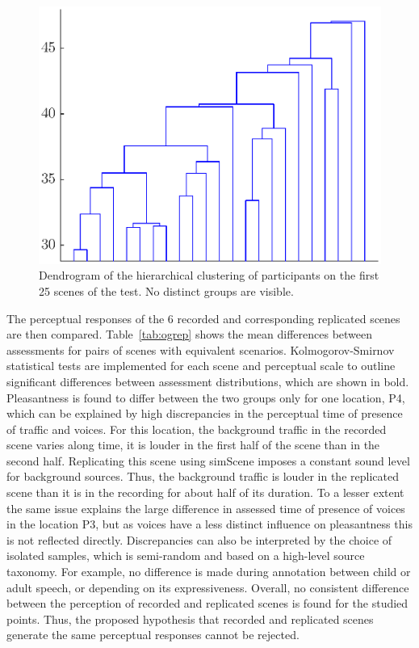 \documentclass[11pt,a4paper]{article}
\begin{document}
\begin{figure}[!h]
    \centering
    \includegraphics[width=\textwidth]{figures/subj_gr.eps}
    \caption{Dendrogram of the hierarchical clustering of participants on the first 25 scenes of the test. No distinct groups are visible.}\label{fig:hclusters}
\end{figure}



The perceptual responses of the 6 recorded and corresponding replicated scenes are then compared. Table~\ref{tab:ogrep} shows the mean differences between assessments for pairs of scenes with equivalent scenarios. Kolmogorov-Smirnov statistical tests are implemented for each scene and perceptual scale to outline significant differences between assessment distributions, which are shown in bold. Pleasantness is found to differ between the two groups only for one location, P4, which can be explained by high discrepancies in the perceptual time of presence of traffic and voices. For this location, the background traffic in the recorded scene varies along time, it is louder in the first half of the scene than in the second half. Replicating this scene using simScene imposes a constant sound level for background sources. Thus, the background traffic is louder in the replicated scene than it is in the recording for about half of its duration. To a lesser extent the same issue explains the large difference in assessed time of presence of voices in the location P3, but as voices have a less distinct influence on pleasantness this is not reflected directly. Discrepancies can also be interpreted by the choice of isolated samples, which is semi-random and based on a high-level source taxonomy. For example, no difference is made during annotation between child or adult speech, or depending on its expressiveness. Overall, no consistent difference between the perception of recorded and replicated scenes is found for the studied points. Thus, the proposed hypothesis that recorded and replicated scenes generate the same perceptual responses cannot be rejected.\\
\end{document}
